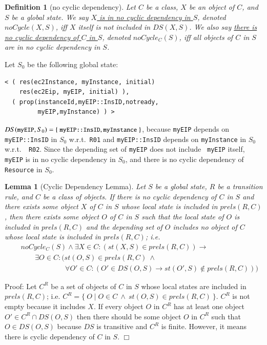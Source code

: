 \documentclass[12pt]{report}
\newtheorem{lemma}{Lemma}
\newtheorem{definition}{Definition}
\newcommand{\ra}{\rightarrow}
\newcommand{\mbstt}[1]{\mbox{\small{\tt {#1}}}}
\newcommand{\stt}[1]{{\small{\tt {#1}}}}
\newcommand{\ul}{\underline}
\begin{document}
\begin{definition}[no cyclic dependency]
Let $C$ be a class, $X$ be an object of $C$, and $S$ be a global
state. We say \ul{$X$ is in no cyclic dependency in $S$}, denoted
\ul{$noCycle(X,S)$}, iff $X$ itself is not included in $DS(X,S)$. We
also say \ul{there is no cyclic dependency of $C$ in $S$}, denoted
\ul{$noCycle_C(S)$}, iff all objects of $C$ in $S$ are in no cyclic
dependency in $S$.
\end{definition}
Let $S_0$ be the following global state:
\begin{verbatim}
< ( res(ec2Instance, myInstance, initial)
    res(ec2Eip, myEIP, initial) ),
  ( prop(instanceId,myEIP::InsID,notready,
         myEIP,myInstance) ) >
\end{verbatim}
$DS(\mbstt{myEIP},S_0) =
\{~\mbstt{myEIP::InsID},\mbstt{myInstance}~\}$, because {\tt myEIP}
depends on \stt{myEIP::InsID} in $S_0$ w.r.t.\ {\tt R01} and
\stt{myEIP::InsID} depends on {\tt myInstance} in $S_0$ w.r.t.\ {\tt
  R02}. Since the depending set of {\tt myEIP} does not include {\tt
  myEIP} itself, {\tt myEIP} is in no cyclic dependency in $S_0$, and
there is no cyclic dependency of {\tt Resource} in $S_0$.
\begin{lemma}[Cyclic Dependency Lemma]
Let $S$ be a global state, $R$ be a transition rule, and $C$ be a
class of objects. If there is no cyclic dependency of $C$ in $S$
and there exists some object $X$ of $C$ in $S$ whose local state
is included in $prels(R,C)$, then there exists some object $O$ of $C$ in
$S$ such that the local state of $O$ is included in $prels(R,C)$ and the
depending set of $O$ includes no object of $C$ whose local
state is included in $prels(R,C)$; i.e.
\begin{eqnarray*}
&&noCycle_C(S)\land\exists X\in C:(st(X,S)\in prels(R,C)) \ra\\
&&\:\:\:\:\:\:\:\:\:\exists O\in C:(st(O,S)\in prels(R,C)\ \land\\
&&\:\:\:\:\:\:\:\:\:\:\:\:\:\:\:\:\:\:\:\:\:\:\:\:\:\:\:\:
\forall O'\in C:(O'\in DS(O,S)\ra st(O',S)\not\in prels(R,C)))
\end{eqnarray*}
\end{lemma}
Proof: Let $C^R$ be a set of objects of $C$ in $S$ whose local states
are included in $prels(R,C)$; i.e. $C^R=\{~O\mid O\in C~\land~
st(O,S)\in prels(R,C)~\}$. $C^R$ is not empty because it includes $X$.
If every object $O$ in $C^R$ has at least one object $O' \in C^R\cap
DS(O,S)$ then there should be some object $O$ in $C^R$ such that $O
\in DS(O,S)$ because $DS$ is transitive and $C^R$ is finite. However,
it means there is cyclic dependency of $C$ in $S$. $\Box$\\
\end{document}
